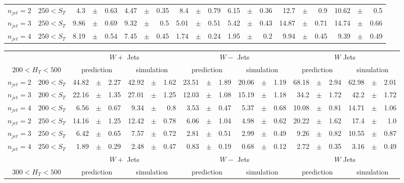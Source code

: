 \documentclass[12pt]{paper}
\begin{document}
\begin{sidewaystable}[ht]
\begin{center}
\begin{tabular}{cc|rrr|rrr|rrr|rrr|rrr|rrr}
$n_{jet}=2$ & $250< S_{T}$ & 4.3&$\pm$&0.63 & 4.47&$\pm$&0.35 & 8.4&$\pm$&0.79 & 6.15&$\pm$&0.36 & 12.7&$\pm$&0.9 & 10.62&$\pm$&0.5\\
$n_{jet}=3$ & $250< S_{T}$ & 9.86&$\pm$&0.69 & 9.32&$\pm$&0.5 & 5.01&$\pm$&0.51 & 5.42&$\pm$&0.43 & 14.87&$\pm$&0.71 & 14.74&$\pm$&0.66\\
$n_{jet}=4$ & $250< S_{T}$ & 8.19&$\pm$&0.54 & 7.45&$\pm$&0.45 & 1.74&$\pm$&0.24 & 1.95&$\pm$&0.2 & 9.94&$\pm$&0.45 & 9.39&$\pm$&0.49\\
\end{tabular}
\end{center}
\end{sidewaystable}

\begin{sidewaystable}[ht]
\begin{center}
\begin{tabular}{cc|rrr|rrr|rrr|rrr|rrr|rrr}
& & \multicolumn{6}{c|}{$W+$ Jets}&\multicolumn{6}{c|}{$W-$ Jets}&\multicolumn{6}{c}{$W$ Jets}\\
\multicolumn{2}{c|}{$200< H_{T}< 500$} & \multicolumn{3}{c}{prediction}&\multicolumn{3}{c|}{simulation}&\multicolumn{3}{c}{prediction}&\multicolumn{3}{c|}{simulation}&\multicolumn{3}{c}{prediction}&\multicolumn{3}{c}{simulation}\\\hline
$n_{jet}=2$ & $200< S_{T}$ & 44.82&$\pm$&2.27 & 42.92&$\pm$&1.62 & 23.51&$\pm$&1.89 & 20.06&$\pm$&1.19 & 68.18&$\pm$&2.94 & 62.98&$\pm$&2.01\\
$n_{jet}=3$ & $200< S_{T}$ & 22.16&$\pm$&1.35 & 27.01&$\pm$&1.25 & 12.03&$\pm$&1.08 & 15.19&$\pm$&1.18 & 34.2&$\pm$&1.72 & 42.2&$\pm$&1.72\\
$n_{jet}=4$ & $200< S_{T}$ & 6.56&$\pm$&0.67 & 9.34&$\pm$&0.8 & 3.53&$\pm$&0.47 & 5.37&$\pm$&0.68 & 10.08&$\pm$&0.81 & 14.71&$\pm$&1.06\\
$n_{jet}=2$ & $250< S_{T}$ & 14.16&$\pm$&1.25 & 12.42&$\pm$&0.78 & 6.06&$\pm$&1.04 & 4.98&$\pm$&0.62 & 20.22&$\pm$&1.62 & 17.4&$\pm$&1.0\\
$n_{jet}=3$ & $250< S_{T}$ & 6.42&$\pm$&0.65 & 7.57&$\pm$&0.72 & 2.81&$\pm$&0.51 & 2.99&$\pm$&0.49 & 9.26&$\pm$&0.82 & 10.55&$\pm$&0.87\\
$n_{jet}=4$ & $250< S_{T}$ & 1.89&$\pm$&0.29 & 2.48&$\pm$&0.47 & 0.83&$\pm$&0.19 & 0.68&$\pm$&0.12 & 2.72&$\pm$&0.35 & 3.16&$\pm$&0.49\\
\hline
& & \multicolumn{6}{c|}{$W+$ Jets}&\multicolumn{6}{c|}{$W-$ Jets}&\multicolumn{6}{c}{$W$ Jets}\\
\multicolumn{2}{c|}{$300< H_{T}< 500$} & \multicolumn{3}{c}{prediction}&\multicolumn{3}{c|}{simulation}&\multicolumn{3}{c}{prediction}&\multicolumn{3}{c|}{simulation}&\multicolumn{3}{c}{prediction}&\multicolumn{3}{c}{simulation}\\\hline

\end{tabular}
\end{center}
\end{sidewaystable}
\end{document}

